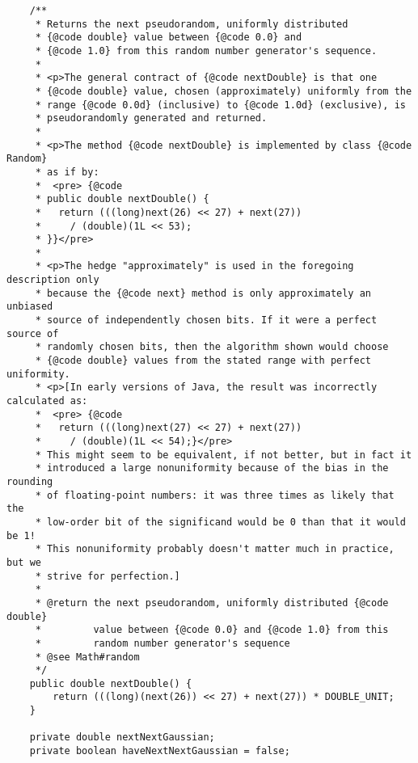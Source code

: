 \documentclass[12pt,a4paper,twoside,openright,titlepage,final]{article}
\begin{document}
\begin{verbatim}
    /**
     * Returns the next pseudorandom, uniformly distributed
     * {@code double} value between {@code 0.0} and
     * {@code 1.0} from this random number generator's sequence.
     *
     * <p>The general contract of {@code nextDouble} is that one
     * {@code double} value, chosen (approximately) uniformly from the
     * range {@code 0.0d} (inclusive) to {@code 1.0d} (exclusive), is
     * pseudorandomly generated and returned.
     *
     * <p>The method {@code nextDouble} is implemented by class {@code Random}
     * as if by:
     *  <pre> {@code
     * public double nextDouble() {
     *   return (((long)next(26) << 27) + next(27))
     *     / (double)(1L << 53);
     * }}</pre>
     *
     * <p>The hedge "approximately" is used in the foregoing description only
     * because the {@code next} method is only approximately an unbiased
     * source of independently chosen bits. If it were a perfect source of
     * randomly chosen bits, then the algorithm shown would choose
     * {@code double} values from the stated range with perfect uniformity.
     * <p>[In early versions of Java, the result was incorrectly calculated as:
     *  <pre> {@code
     *   return (((long)next(27) << 27) + next(27))
     *     / (double)(1L << 54);}</pre>
     * This might seem to be equivalent, if not better, but in fact it
     * introduced a large nonuniformity because of the bias in the rounding
     * of floating-point numbers: it was three times as likely that the
     * low-order bit of the significand would be 0 than that it would be 1!
     * This nonuniformity probably doesn't matter much in practice, but we
     * strive for perfection.]
     *
     * @return the next pseudorandom, uniformly distributed {@code double}
     *         value between {@code 0.0} and {@code 1.0} from this
     *         random number generator's sequence
     * @see Math#random
     */
    public double nextDouble() {
        return (((long)(next(26)) << 27) + next(27)) * DOUBLE_UNIT;
    }

    private double nextNextGaussian;
    private boolean haveNextNextGaussian = false;


\end{verbatim}
\end{document}
